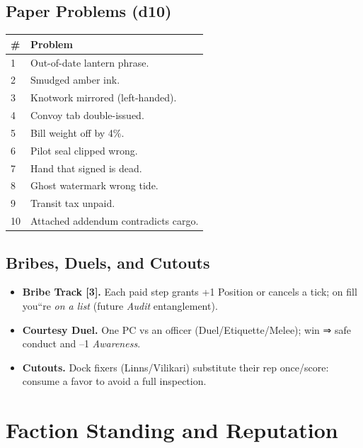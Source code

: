 \documentclass[11pt,oneside]{book}
\begin{document}
\subsection*{Paper Problems (d10)}
\begin{tabularx}{\linewidth}{@{}p{0.7cm} X@{}}
\toprule
\# & \textbf{Problem}\\
\midrule
1 & Out-of-date lantern phrase.\\
2 & Smudged amber ink.\\
3 & Knotwork mirrored (left-handed).\\
4 & Convoy tab double-issued.\\
5 & Bill weight off by 4\%.\\
6 & Pilot seal clipped wrong.\\
7 & Hand that signed is dead.\\
8 & Ghost watermark wrong tide.\\
9 & Transit tax unpaid.\\
10 & Attached addendum contradicts cargo.\\
\bottomrule
\end{tabularx}

\subsection*{Bribes, Duels, and Cutouts}
\begin{itemize}
  \item \textbf{Bribe Track [3].} Each paid step grants +1 Position or cancels a tick; on fill you``re \emph{on a list} (future \emph{Audit} entanglement).
  \item \textbf{Courtesy Duel.} One PC vs an officer (Duel/Etiquette/Melee); win ⇒ safe conduct and --1 \textit{Awareness}.
  \item \textbf{Cutouts.} Dock fixers (Linns/Vilikari) substitute their rep once/score: consume a favor to avoid a full inspection.
\end{itemize}

\section{Faction Standing and Reputation}
\end{document}
